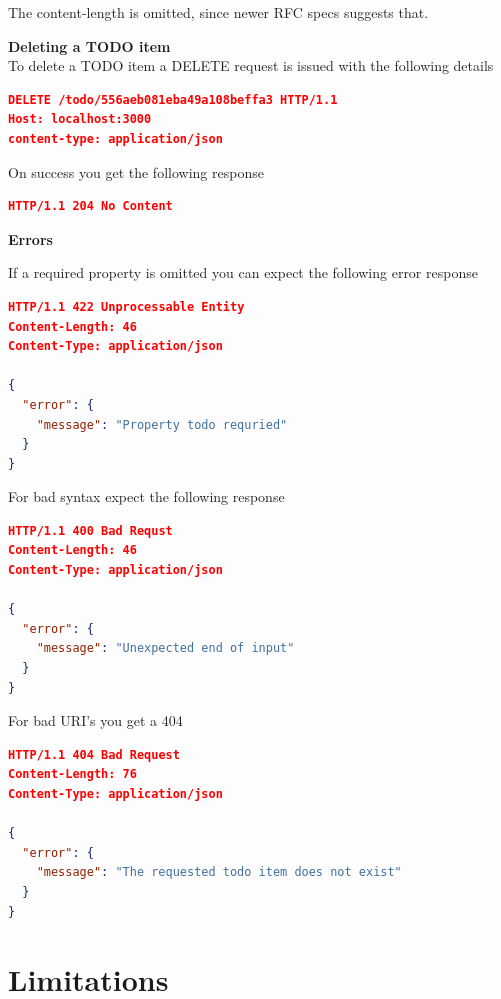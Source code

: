 \documentclass[a4paper,danish]{dnacm} %
\begin{document}
The content-length is omitted, since newer RFC specs suggests that.


\textbf{Deleting a TODO item}\\

To delete a TODO item a DELETE request is issued with the following details

\begin{lstlisting}[language=json,firstnumber=1]
DELETE /todo/556aeb081eba49a108beffa3 HTTP/1.1
Host: localhost:3000
content-type: application/json

\end{lstlisting}

On success you get the following response

\begin{lstlisting}[language=json,firstnumber=1]
HTTP/1.1 204 No Content
\end{lstlisting}


\textbf{Errors}

If a required property is omitted you can expect the following error response

\begin{lstlisting}[language=json,firstnumber=1]
HTTP/1.1 422 Unprocessable Entity
Content-Length: 46
Content-Type: application/json

{
  "error": {
    "message": "Property todo requried"
  }
}
\end{lstlisting}

For bad syntax expect the following response

\begin{lstlisting}[language=json,firstnumber=1]
HTTP/1.1 400 Bad Requst
Content-Length: 46
Content-Type: application/json

{
  "error": {
    "message": "Unexpected end of input"
  }
}
\end{lstlisting}

For bad URI's you get a 404

\begin{lstlisting}[language=json,firstnumber=1]
HTTP/1.1 404 Bad Request
Content-Length: 76
Content-Type: application/json

{
  "error": {
    "message": "The requested todo item does not exist"
  }
}
\end{lstlisting}


\section{Limitations}
\end{document}
